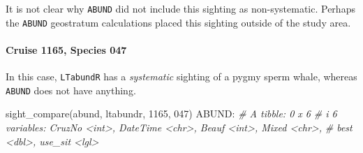 \documentclass[
]{book}
\newenvironment{Shaded}{\begin{snugshade}}{\end{snugshade}}
\newcommand{\CommentTok}[1]{\textcolor[rgb]{0.56,0.35,0.01}{\textit{#1}}}
\newcommand{\DecValTok}[1]{\textcolor[rgb]{0.00,0.00,0.81}{#1}}
\newcommand{\FunctionTok}[1]{\textcolor[rgb]{0.00,0.00,0.00}{#1}}
\newcommand{\NormalTok}[1]{#1}
\newcommand{\SpecialCharTok}[1]{\textcolor[rgb]{0.00,0.00,0.00}{#1}}
\newcommand{\StringTok}[1]{\textcolor[rgb]{0.31,0.60,0.02}{#1}}
\begin{document}
It is not clear why \texttt{ABUND} did not include this sighting as non-systematic. Perhaps the \texttt{ABUND} geostratum calculations placed this sighting outside of the study area.

\hypertarget{cruise-1165-species-047}{%
\paragraph*{Cruise 1165, Species 047}\label{cruise-1165-species-047}}

In this case, \texttt{LTabundR} has a \emph{systematic} sighting of a pygmy sperm whale, whereas \texttt{ABUND} does not have anything.

\begin{Shaded}
\begin{Highlighting}[]
\FunctionTok{sight\_compare}\NormalTok{(abund, ltabundr, }\DecValTok{1165}\NormalTok{, }\StringTok{\textquotesingle{}047\textquotesingle{}}\NormalTok{)}
\NormalTok{ABUND}\SpecialCharTok{:}
\CommentTok{\# A tibble: 0 x 6}
\CommentTok{\# i 6 variables: CruzNo \textless{}int\textgreater{}, DateTime \textless{}chr\textgreater{}, Beauf \textless{}int\textgreater{}, Mixed \textless{}chr\textgreater{},}
\CommentTok{\#   best \textless{}dbl\textgreater{}, use\_sit \textless{}lgl\textgreater{}}


\end{Highlighting}
\end{Shaded}
\end{document}
